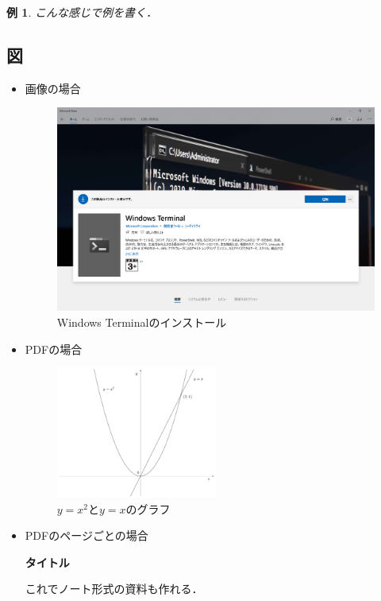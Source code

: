 \documentclass[uplatex]{jsarticle}
\newtheorem{ex}{例}
\begin{document}
\begin{ex}
    こんな感じで例を書く．
\end{ex}

\newpage
\subsection{図}
\begin{itemize}
    \item 画像の場合
    \begin{figure}[H]
        \centering
        \includegraphics[scale=0.25]{./fig/install_terminal.png}
        \caption{Windows Terminalのインストール}
        \label{fig:install_terminal}
    \end{figure}
    \item PDFの場合
    \begin{figure}[H]
        \centering
        \includegraphics[width=0.5\textwidth]{./fig/graph.pdf}
        \caption{$y=x^2$と$y=x$のグラフ}
        \label{fig:graph1}
    \end{figure}
    \newpage
    \item PDFのページごとの場合
    \begin{figure}[H]
        \centering
    \end{figure}
    
    \noindent
    \textbf{タイトル}

    これでノート形式の資料も作れる．
\end{itemize}
\end{document}
